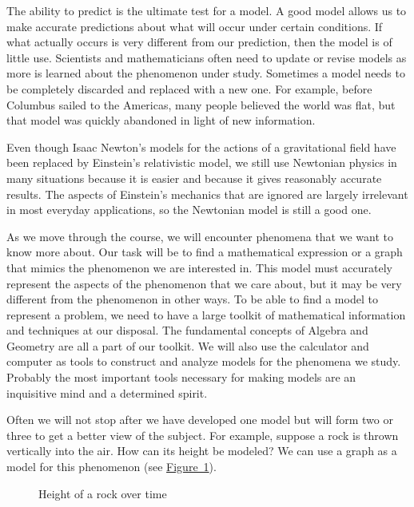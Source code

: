 \documentclass[10pt,]{book}
\theoremstyle{ptxdefinitionnotitle}
\theoremstyle{ptxdefinitiontitle}
\numberwithin{equation}{section}
\begin{document}
The ability to predict is the ultimate test for a model. A good model allows us to make accurate predictions about what will occur under certain conditions. If what actually occurs is very different from our prediction, then the model is of little use. Scientists and mathematicians often need to update or revise models as more is learned about the phenomenon under study. Sometimes a model needs to be completely discarded and replaced with a new one. For example, before Columbus sailed to the Americas, many people believed the world was flat, but that model was quickly abandoned in light of new information.%
\par
\hypertarget{p-8}{}%
Even though Isaac Newton’s models for the actions of a gravitational field have been replaced by Einstein’s relativistic model, we still use Newtonian physics in many situations because it is easier and because it gives reasonably accurate results. The aspects of Einstein's mechanics that are ignored are largely irrelevant in most everyday applications, so the Newtonian model is still a good one.%
\par
\hypertarget{p-9}{}%
As we move through the course, we will encounter phenomena that we want to know more about. Our task will be to find a mathematical expression or a graph that mimics the phenomenon we are interested in. This model must accurately represent the aspects of the phenomenon that we care about, but it may be very different from the phenomenon in other ways. To be able to find a model to represent a problem, we need to have a large toolkit of mathematical information and techniques at our disposal. The fundamental concepts of Algebra and Geometry are all a part of our toolkit. We will also use the calculator and computer as tools to construct and analyze models for the phenomena we study. Probably the most important tools necessary for making models are an inquisitive mind and a determined spirit.%
\par
\hypertarget{p-10}{}%
Often we will not stop after we have developed one model but will form two or three to get a better view of the subject. For example, suppose a rock is thrown vertically into the air. How can its height be modeled? We can use a graph as a model for this phenomenon (see \hyperref[height-of-a-rock-over-time]{Figure~1}).%
\begin{figure}
\centering
{
}
\caption{Height of a rock over time\label{height-of-a-rock-over-time}}
\end{figure}
\end{document}
